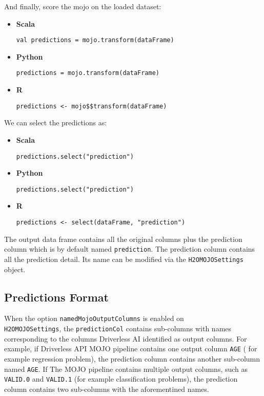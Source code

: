 And finally, score the mojo on the loaded dataset:

\begin{itemize}
    \item \textbf{Scala} \begin{lstlisting}[style=Scala]
val predictions = mojo.transform(dataFrame)
    \end{lstlisting}
    \item \textbf{Python} \begin{lstlisting}[style=Python]
predictions = mojo.transform(dataFrame)
    \end{lstlisting}
    \item \textbf{R} \begin{lstlisting}[style=R]
predictions <- mojo$$transform(dataFrame)
    \end{lstlisting}
\end{itemize}

We can select the predictions as:

\begin{itemize}
    \item \textbf{Scala} \begin{lstlisting}[style=Scala]
predictions.select("prediction")
    \end{lstlisting}
    \item \textbf{Python} \begin{lstlisting}[style=Python]
predictions.select("prediction")
    \end{lstlisting}
    \item \textbf{R} \begin{lstlisting}[style=R]
predictions <- select(dataFrame, "prediction")
    \end{lstlisting}
\end{itemize}


The output data frame contains all the original columns plus the prediction column which is by default named
\texttt{prediction}. The prediction column contains all the prediction detail. Its name can be
modified via the \texttt{H2OMOJOSettings} object.

\subsection{Predictions Format}

When the option \texttt{namedMojoOutputColumns} is enabled on\\ \texttt{H2OMOJOSettings}, the \texttt{predictionCol} contains sub-columns with
names corresponding to the columns Driverless AI identified as output columns. For example, if Driverless API MOJO
pipeline contains one output column \texttt{AGE} ( for example regression problem), the prediction column contains another sub-column
named \texttt{AGE}. If The MOJO pipeline contains multiple output columns, such as \texttt{VALID.0} and \texttt{VALID.1} (for example classification problems),
the prediction column contains two sub-columns with the aforementined names.


